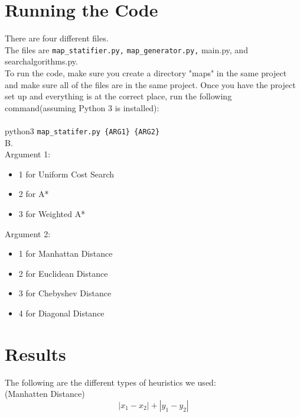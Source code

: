 \documentclass{report}
\begin{document}
    \section{Running the Code}
    There are four different files. \\

    The files are \verb|map_statifier.py,| \verb |map_generator.py,| main.py, and searchalgorithms.py. \\

    To run the code, make sure you create a directory "maps" in the same project and make sure all of the files are in the same project. Once you have the project set up and everything is at the correct place, run the following command(assuming Python 3 is installed): \\ \\

    python3 \verb|map_statifer.py {ARG1} {ARG2}| \\

{\huge B.} \\

\setlength{\parindent}{4em} Argument 1:
        \begin{itemize}
            \item 1 for Uniform Cost Search
            \item 2 for A*
            \item 3 for Weighted A*
        \end{itemize}

\setlength{\parindent}{4em} Argument 2:
    \setlength\parindent{24pt}
    \begin{itemize}
        \item 1 for Manhattan Distance
        \item 2 for Euclidean Distance
        \item 3 for Chebyshev Distance
        \item 4 for Diagonal Distance
    \end{itemize}



    \section{Results}
        The following are the different types of heuristics we used:\\

        (Manhatten Distance)
       \begin{equation}
           |x_1 - x_2| + |y_1 - y_2|
       \end{equation}
\end{document}

